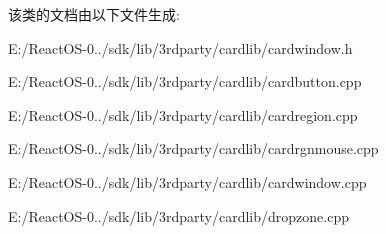 该类的文档由以下文件生成\+:\begin{DoxyCompactItemize}
\item 
E\+:/\+React\+O\+S-\/0../sdk/lib/3rdparty/cardlib/cardwindow.\+h\item 
E\+:/\+React\+O\+S-\/0../sdk/lib/3rdparty/cardlib/cardbutton.\+cpp\item 
E\+:/\+React\+O\+S-\/0../sdk/lib/3rdparty/cardlib/cardregion.\+cpp\item 
E\+:/\+React\+O\+S-\/0../sdk/lib/3rdparty/cardlib/cardrgnmouse.\+cpp\item 
E\+:/\+React\+O\+S-\/0../sdk/lib/3rdparty/cardlib/cardwindow.\+cpp\item 
E\+:/\+React\+O\+S-\/0../sdk/lib/3rdparty/cardlib/dropzone.\+cpp\end{DoxyCompactItemize}
